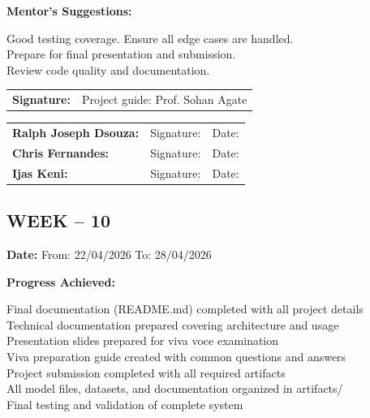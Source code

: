 \documentclass[12pt,a4paper]{article}
\begin{document}
\medskip

\noindent\textbf{Mentor's Suggestions:}

\medskip

\noindent Good testing coverage. Ensure all edge cases are handled. \\
Prepare for final presentation and submission. \\
Review code quality and documentation.

\medskip

\noindent\begin{tabular}{p{4cm} p{6cm}}
\textbf{Signature:} & Project guide: Prof. Sohan Agate \\
\end{tabular}

\medskip

\noindent\begin{tabular}{p{3.5cm} p{5cm} p{3cm}}
\textbf{Ralph Joseph Dsouza:} & Signature: \underline{\hspace{4cm}} & Date: \underline{\hspace{2cm}} \\
\textbf{Chris Fernandes:} & Signature: \underline{\hspace{4cm}} & Date: \underline{\hspace{2cm}} \\
\textbf{Ijas Keni:} & Signature: \underline{\hspace{4cm}} & Date: \underline{\hspace{2cm}} \\
\end{tabular}

\newpage

\subsection*{WEEK – 10}
\vspace{0.3cm}

\textbf{Date:} From: 22/04/2026 To: 28/04/2026

\medskip

\noindent\textbf{Progress Achieved:}

\medskip

\noindent Final documentation (README.md) completed with all project details \\
Technical documentation prepared covering architecture and usage \\
Presentation slides prepared for viva voce examination \\
Viva preparation guide created with common questions and answers \\
Project submission completed with all required artifacts \\
All model files, datasets, and documentation organized in artifacts/ \\
Final testing and validation of complete system
\end{document}

